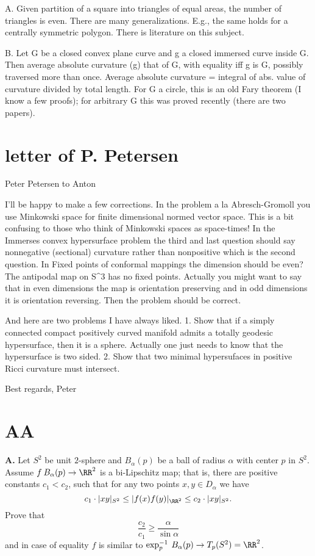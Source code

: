 A. Given partition of a square into triangles of equal areas, the
number of triangles is even. There are many generalizations. E.g.,
the same holds for a centrally symmetric polygon. There is literature
on this subject.

B. Let G be a closed convex plane curve and g a closed immersed curve
inside G. Then average absolute curvature (g) \geq that of G, with
equality iff g is G, possibly traversed more than once. Average
absolute curvature = integral of abs. value of curvature divided by
total length.
For G a circle, this is an old Fary theorem (I know a few proofs);
for arbitrary G this was proved recently (there are two papers).



\chapter{letter of P. Petersen}

Peter Petersen 	to Anton

I'll be happy to make a few corrections.
In the problem a la Abresch-Gromoll you use Minkowski space for finite
dimensional normed vector space. This is a bit confusing to those who
think of Minkowski spaces as space-times!
In the Immerses convex hypersurface problem the third and last question
should say nonnegative (sectional) curvature rather than nonpositive which
is the second question.
In Fixed points of conformal mappings the dimension should be even? The
antipodal map on S^3 has no fixed points. Actually you might want to say
that in even dimensions the map is orientation preserving and in odd
dimensions it is orientation reversing. 
Then the problem should be correct.

And here are two problems I have always liked.
1. Show that if a
simply connected
compact positively curved manifold admits a totally geodesic hypersurface,
then it is a sphere. Actually one just needs to know that the hypersurface
is two sided.
2. Show that two minimal hypersufaces in positive Ricci curvature must
intersect.

Best regards, Peter








\chapter{AA}

{\bf A.} Let $S^2$ be unit $2$-sphere and
$B_\alpha(p)$ be a ball of
radius $\alpha$ with center $p$ in $S^2$.
Assume $f\:B_\alpha(p)\to \RR^2$ is a bi-Lipschitz map;
that is, there are positive constants $c_1 < c_2$, such that for any two points
$x,y\in D_\alpha$ we have
$$c_1\cdot |x y|_{S^2}\le |f(x)f(y)|_{\RR^2} \le c_2\cdot|x y|_{S^2}.$$
Prove that
$$\frac{c_2}{c_1}\ge \frac{\alpha}{\sin\alpha}$$
and in case of equality
$f$ is similar to $\exp_p^{-1}\:B_\alpha(p)\to T_p(S^2)=\RR^2$.

